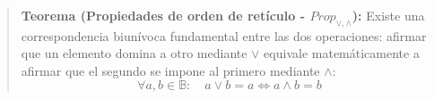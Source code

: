 \begin{quote}\textbf{Teorema (Propiedades de orden de retículo - $Prop_{\vee,\wedge}$):}\label{prop_reticulo}
Existe una correspondencia biunívoca fundamental entre las dos operaciones: afirmar que un elemento domina a otro mediante $\vee$ equivale matemáticamente a afirmar que el segundo se impone al primero mediante $\wedge:$
\[ \forall a, b \in \mathbb{B}: \quad a \vee b = a \iff a \wedge b = b \]
\end{quote}

